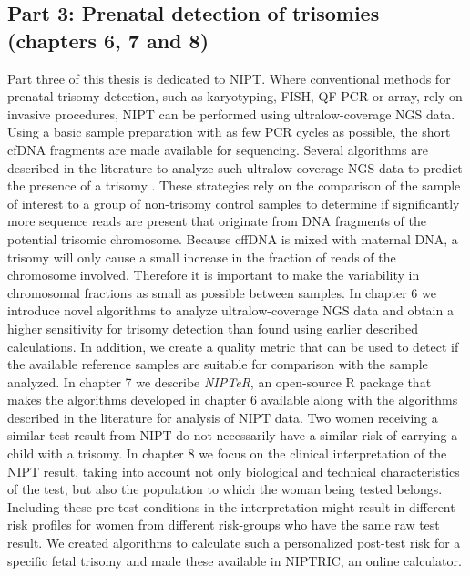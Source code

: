 \subsection{Part 3: Prenatal detection of trisomies (chapters 6, 7 and 8)}\label{Part3}
Part three of this thesis is dedicated to NIPT. Where conventional methods for prenatal trisomy detection, such as karyotyping, FISH, QF-PCR or array, rely on invasive procedures, NIPT can be performed using ultralow-coverage NGS data. Using a basic sample preparation with as few PCR cycles as possible, the short cfDNA fragments are made available for sequencing. 
Several algorithms are described in the literature to analyze such ultralow-coverage NGS data to predict the presence of a trisomy \cite{Chiu_2008,Fan_2010,Sehnert_2011}. 
These strategies rely on the comparison of the sample of interest to a group of non-trisomy control samples to determine if significantly more sequence reads are present that originate from DNA fragments of the potential trisomic chromosome. 
Because cffDNA is mixed with maternal DNA, a trisomy will only cause a small increase in the fraction of reads of the chromosome involved. 
Therefore it is important to make the variability in chromosomal fractions as small as possible between samples. 
In chapter 6 we introduce novel algorithms to analyze ultralow-coverage NGS data and obtain a higher sensitivity for trisomy detection than found using earlier described calculations. 
In addition, we create a quality metric that can be used to detect if the available reference samples are suitable for comparison with the sample analyzed. 
In chapter 7 we describe \textsl{NIPTeR}, an open-source R package that makes the algorithms developed in chapter 6 available along with the algorithms described in the literature for analysis of NIPT data. 
Two women receiving a similar test result from NIPT do not necessarily have a similar risk of carrying a child with a trisomy. 
In chapter 8 we focus on the clinical interpretation of the NIPT result, taking into account not only biological and technical characteristics of the test, but also the population to which the woman being tested belongs. 
Including these pre-test conditions in the interpretation might result in different risk profiles for women from different risk-groups who have the same raw test result. 
We created algorithms to calculate such a personalized post-test risk for a specific fetal trisomy and made these available in NIPTRIC, an online calculator. 


